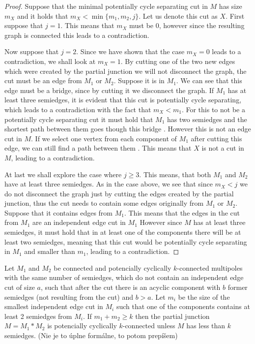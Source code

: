 \documentclass[12pt, twoside]{book}
\begin{document}
\begin{proof}
	Suppose that the minimal potentially cycle separating cut in $M$ has size $m_X$ and it holds that $m_X<\min\{m_1,m_2,j\}$. Let us denote this cut as $X$. First suppose that $j=1$. This means that $m_X$ must be 0, however since the resulting graph is connected  this leads to a contradiction.
	
	Now suppose that $j=2$. Since we have shown that the case $m_X=0$ leads to a contradiction, we shall look at $m_X=1$. By cutting one of the two new edges which were created by the partial junction we will not disconnect the graph, the cut must be an edge from $M_1$ or $M_2$. Suppose it is in $M_1$. We can see that this edge must be a bridge, since by cutting it we disconnect the graph. If $M_1$ has at least three semiedges, it is evident that this cut is potentially cycle separating, which leads to a contradiction with the fact that $m_X<m_1$. For this to not be a potentially cycle separating cut it must hold that $M_1$ has two semiedges and the shortest path between them goes though this bridge . However this is not an edge cut in $M$. If we select one vertex from each component of $M_1$ after cutting this edge, we can still find a path between them . This means that $X$ is not a cut in $M$, leading to a contradiction.
	
	At last we shall explore the case where $j\geq 3$. This means, that both $M_1$ and $M_2$ have at least three semiedges. As in the case above, we see that since $m_X<j$ we do not disconnect the graph just by cutting the edges created by the partial junction, thus the cut needs to contain some edges originally from $M_1$ or $M_2$. Suppose that it contains edges from $M_1$. This means that the edges in the cut from $M_1$ are an independent edge cut in $M_1$  However since $M$ has at least three semiedges, it must hold that in at least one of the components there will be at least two semiedges, meaning that this cut would be potentially cycle separating in $M_1$ and smaller than $m_1$, leading to a contradiction.
	
\end{proof}

\begin{theorem}\label{th:connecting-potencially-k-connected}
	Let $M_1$ and $M_2$ be connected and potencially cyclically $k$-connected multipoles with the same number of semiedges, which do not contain an independent edge cut of size $a$, such that after the cut there is an acyclic component with $b$ former semiedges (not resulting from the cut) and $b>a$. Let $m_i$ be the size of the smallest independent edge cut in $M_i$ such that one of the components contains at least 2 semiedges from $M_i$. If $m_1+m_2\geq k$ then the partial junction $M=M_1*M_2$ is potencially cyclically $k$-connected unless $M$ has less than $k$ semiedges. (Nie je to úplne formálne, to potom prepíšem)
\end{theorem}
\end{document}
